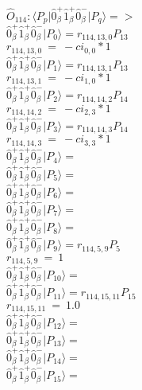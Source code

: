 \documentclass[14pt]{article}
\begin{document}
    $\hat{O}_{114}:  \langle{P_p}\vert \hat{0}_{\beta}^{+}\hat{1}_{\beta}^{+}\hat{0}_{\beta}^{-} \vert{P_q}\rangle => $ \\ 
    $ \hat{0}_{\beta}^{+}\hat{1}_{\beta}^{+}\hat{0}_{\beta}^{-} \vert{P_{0}}\rangle = {r}_{114,13,0}P_{13} $ \\ 
    ${r}_{114,13,0}\ =\ -{ci}_{0,0}*1 $ \\ 
    $ \hat{0}_{\beta}^{+}\hat{1}_{\beta}^{+}\hat{0}_{\beta}^{-} \vert{P_{1}}\rangle = {r}_{114,13,1}P_{13} $ \\ 
    ${r}_{114,13,1}\ =\ -{ci}_{1,0}*1 $ \\ 
    $ \hat{0}_{\beta}^{+}\hat{1}_{\beta}^{+}\hat{0}_{\beta}^{-} \vert{P_{2}}\rangle = {r}_{114,14,2}P_{14} $ \\ 
    ${r}_{114,14,2}\ =\ -{ci}_{2,3}*1 $ \\ 
    $ \hat{0}_{\beta}^{+}\hat{1}_{\beta}^{+}\hat{0}_{\beta}^{-} \vert{P_{3}}\rangle = {r}_{114,14,3}P_{14} $ \\ 
    ${r}_{114,14,3}\ =\ -{ci}_{3,3}*1 $ \\ 
    $ \hat{0}_{\beta}^{+}\hat{1}_{\beta}^{+}\hat{0}_{\beta}^{-} \vert{P_{4}}\rangle =  $ \\ 
    $ \hat{0}_{\beta}^{+}\hat{1}_{\beta}^{+}\hat{0}_{\beta}^{-} \vert{P_{5}}\rangle =  $ \\ 
    $ \hat{0}_{\beta}^{+}\hat{1}_{\beta}^{+}\hat{0}_{\beta}^{-} \vert{P_{6}}\rangle =  $ \\ 
    $ \hat{0}_{\beta}^{+}\hat{1}_{\beta}^{+}\hat{0}_{\beta}^{-} \vert{P_{7}}\rangle =  $ \\ 
    $ \hat{0}_{\beta}^{+}\hat{1}_{\beta}^{+}\hat{0}_{\beta}^{-} \vert{P_{8}}\rangle =  $ \\ 
    $ \hat{0}_{\beta}^{+}\hat{1}_{\beta}^{+}\hat{0}_{\beta}^{-} \vert{P_{9}}\rangle = {r}_{114,5,9}P_{5} $ \\ 
    ${r}_{114,5,9}\ =\ 1 $ \\ 
    $ \hat{0}_{\beta}^{+}\hat{1}_{\beta}^{+}\hat{0}_{\beta}^{-} \vert{P_{10}}\rangle =  $ \\ 
    $ \hat{0}_{\beta}^{+}\hat{1}_{\beta}^{+}\hat{0}_{\beta}^{-} \vert{P_{11}}\rangle = {r}_{114,15,11}P_{15} $ \\ 
    ${r}_{114,15,11}\ =\ 1.0 $ \\ 
    $ \hat{0}_{\beta}^{+}\hat{1}_{\beta}^{+}\hat{0}_{\beta}^{-} \vert{P_{12}}\rangle =  $ \\ 
    $ \hat{0}_{\beta}^{+}\hat{1}_{\beta}^{+}\hat{0}_{\beta}^{-} \vert{P_{13}}\rangle =  $ \\ 
    $ \hat{0}_{\beta}^{+}\hat{1}_{\beta}^{+}\hat{0}_{\beta}^{-} \vert{P_{14}}\rangle =  $ \\ 
    $ \hat{0}_{\beta}^{+}\hat{1}_{\beta}^{+}\hat{0}_{\beta}^{-} \vert{P_{15}}\rangle =  $ \\ 
    
\end{document}
